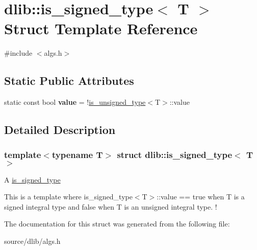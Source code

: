 \hypertarget{structdlib_1_1is__signed__type}{
\section{dlib::is\_\-signed\_\-type$<$ T $>$ Struct Template Reference}
\label{structdlib_1_1is__signed__type}
}


{\ttfamily \#include $<$algs.h$>$}\subsection*{Static Public Attributes}
\begin{DoxyCompactItemize}
\item 
\hypertarget{structdlib_1_1is__signed__type_ac0288d0dddbeb5c11a612739b7ae952e}{
static const bool {\bfseries value} = !\hyperlink{structdlib_1_1is__unsigned__type}{is\_\-unsigned\_\-type}$<$T$>$::value}
\label{structdlib_1_1is__signed__type_ac0288d0dddbeb5c11a612739b7ae952e}

\end{DoxyCompactItemize}


\subsection{Detailed Description}
\subsubsection*{template$<$typename T$>$ struct dlib::is\_\-signed\_\-type$<$ T $>$}

A \hyperlink{structdlib_1_1is__signed__type}{is\_\-signed\_\-type}

This is a template where is\_\-signed\_\-type$<$T$>$::value == true when T is a signed integral type and false when T is an unsigned integral type. ! 

The documentation for this struct was generated from the following file:\begin{DoxyCompactItemize}
\item 
source/dlib/algs.h\end{DoxyCompactItemize}
